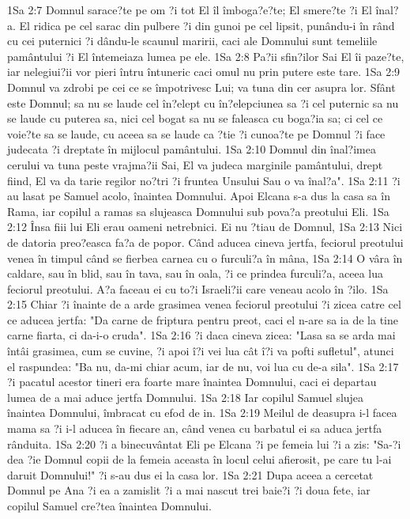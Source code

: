 1Sa 2:7  Domnul sarace?te pe om ?i tot El îl îmboga?e?te; El smere?te ?i El înal?a. El ridica pe cel sarac din pulbere ?i din gunoi pe cel lipsit, punându-i în rând cu cei puternici ?i dându-le scaunul maririi, caci ale Domnului sunt temeliile pamântului ?i El întemeiaza lumea pe ele.
1Sa 2:8  Pa?ii sfin?ilor Sai El îi paze?te, iar nelegiui?ii vor pieri întru întuneric caci omul nu prin putere este tare.
1Sa 2:9  Domnul va zdrobi pe cei ce se împotrivesc Lui; va tuna din cer asupra lor. Sfânt este Domnul; sa nu se laude cel în?elept cu în?elepciunea sa ?i cel puternic sa nu se laude cu puterea sa, nici cel bogat sa nu se faleasca cu boga?ia sa; ci cel ce voie?te sa se laude, cu aceea sa se laude ca ?tie ?i cunoa?te pe Domnul ?i face judecata ?i dreptate în mijlocul pamântului.
1Sa 2:10  Domnul din înal?imea cerului va tuna peste vrajma?ii Sai, El va judeca marginile pamântului, drept fiind, El va da tarie regilor no?tri ?i fruntea Unsului Sau o va înal?a".
1Sa 2:11  ?i au lasat pe Samuel acolo, înaintea Domnului. Apoi Elcana s-a dus la casa sa în Rama, iar copilul a ramas sa slujeasca Domnului sub pova?a preotului Eli.
1Sa 2:12  Însa fiii lui Eli erau oameni netrebnici. Ei nu ?tiau de Domnul,
1Sa 2:13  Nici de datoria preo?easca fa?a de popor. Când aducea cineva jertfa, feciorul preotului venea în timpul când se fierbea carnea cu o furculi?a în mâna,
1Sa 2:14  O vâra în caldare, sau în blid, sau în tava, sau în oala, ?i ce prindea furculi?a, aceea lua feciorul preotului. A?a faceau ei cu to?i Israeli?ii care veneau acolo în ?ilo.
1Sa 2:15  Chiar ?i înainte de a arde grasimea venea feciorul preotului ?i zicea catre cel ce aducea jertfa: "Da carne de friptura pentru preot, caci el n-are sa ia de la tine carne fiarta, ci da-i-o cruda".
1Sa 2:16  ?i daca cineva zicea: "Lasa sa se arda mai întâi grasimea, cum se cuvine, ?i apoi î?i vei lua cât î?i va pofti sufletul", atunci el raspundea: "Ba nu, da-mi chiar acum, iar de nu, voi lua cu de-a sila".
1Sa 2:17  ?i pacatul acestor tineri era foarte mare înaintea Domnului, caci ei departau lumea de a mai aduce jertfa Domnului.
1Sa 2:18  Iar copilul Samuel slujea înaintea Domnului, îmbracat cu efod de in.
1Sa 2:19  Meilul de deasupra i-l facea mama sa ?i i-l aducea în fiecare an, când venea cu barbatul ei sa aduca jertfa rânduita.
1Sa 2:20  ?i a binecuvântat Eli pe Elcana ?i pe femeia lui ?i a zis: "Sa-?i dea ?ie Domnul copii de la femeia aceasta în locul celui afierosit, pe care tu l-ai daruit Domnului!" ?i s-au dus ei la casa lor.
1Sa 2:21  Dupa aceea a cercetat Domnul pe Ana ?i ea a zamislit ?i a mai nascut trei baie?i ?i doua fete, iar copilul Samuel cre?tea înaintea Domnului.
